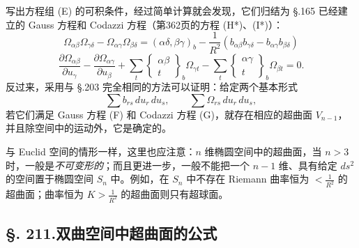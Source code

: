 写出方程组 (E) 的可积条件，经过简单计算就会发现，它们归结为 \S.165 已经建立的 Gauss 方程和 Codazzi 方程（第362页的方程 (H*)、(I*)）：
\[
\tag{F}
\Omega_{\alpha\beta}\Omega_{\gamma\delta}-\Omega_{\alpha\gamma}\Omega_{\beta\delta}
=(\alpha\delta,\beta\gamma)_b-\frac1{R^2}(b_{\alpha\beta}b_{\gamma\delta}-b_{\alpha\gamma}b_{\beta\delta})
\]
\[
\tag{G}
\frac{\partial\Omega_{\alpha\beta}}{\partial u_\gamma}
-\frac{\partial\Omega_{\alpha\gamma}}{\partial u_\beta}
+\sum_t\left\{\begin{matrix}\alpha\beta\\ t\end{matrix}\right\}_b\Omega_{\gamma t}
-\sum_t\left\{\begin{matrix}\alpha\gamma\\ t\end{matrix}\right\}_b\Omega_{\beta t}=0.
\]
反过来，采用与 \S.203 完全相同的方法可以证明：给定两个基本形式
\[
\sum b_{rs}\,du_r\,du_s,\qquad
\sum\Omega_{rs}\,du_r\,du_s,
\]
若它们满足 Gauss 方程 (F) 和 Codazzi 方程 (G)，就存在相应的超曲面 $V_{n-1}$，并且除空间中的运动外，它是确定的。

与 Euclid 空间的情形一样，这里也应注意：$n$ 维椭圆空间中的超曲面，当 $n>3$ 时，一般是\emph{不可变形的}；而且更进一步，一般不能把一个 $n-1$ 维、具有给定 $ds^2$ 的空间置于椭圆空间 $S_n$ 中。例如，在 $S_n$ 中不存在 Riemann 曲率恒为 $<\frac1{R^2}$ 的超曲面；曲率恒为 $K>\frac1{R^2}$ 的超曲面则只有超球面。

\subsection*{\S. 211.\quad 双曲空间中超曲面的公式}

